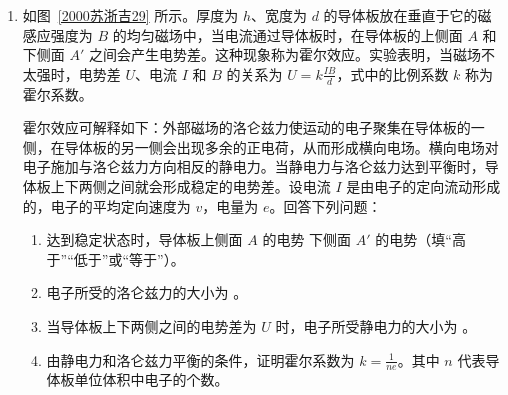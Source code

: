 \documentclass[\gkver]{gaokaozhenti}
\begin{document}
\begin{enumerate}


\item
如图~\ref{2000苏浙吉29} 所示。厚度为 $h$、宽度为 $d$ 的导体板放在垂直于它的磁感应强度为 $B$ 的均匀磁场中，当电流通过导体板时，在导体板的上侧面 $A$ 和下侧面 $A'$ 之间会产生电势差。这种现象称为霍尔效应。实验表明，当磁场不太强时，电势差 $U$、电流 $I$ 和 $B$ 的关系为 $U = k\frac{IB}{d}$，式中的比例系数 $k$ 称为霍尔系数。

霍尔效应可解释如下：外部磁场的洛仑兹力使运动的电子聚集在导体板的一侧，在导体板的另一侧会出现多余的正电荷，从而形成横向电场。横向电场对电子施加与洛仑兹力方向相反的静电力。当静电力与洛仑兹力达到平衡时，导体板上下两侧之间就会形成稳定的电势差。设电流 $I$ 是由电子的定向流动形成的，电子的平均定向速度为 $v$，电量为 $e$。回答下列问题：

\begin{enumerate}
\item
达到稳定状态时，导体板上侧面 $A$ 的电势  下侧面 $A'$ 的电势（填“高于”“低于”或“等于”）。
\item
电子所受的洛仑兹力的大小为 。
\item
当导体板上下两侧之间的电势差为 $U$ 时，电子所受静电力的大小为 。
\item
由静电力和洛仑兹力平衡的条件，证明霍尔系数为 $k = \frac{1}{ne}$。其中 $n$ 代表导体板单位体积中电子的个数。
\end{enumerate}


\end{enumerate}
\end{document}
